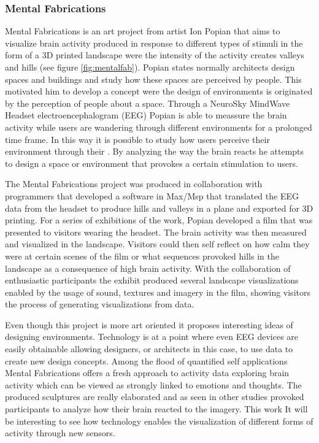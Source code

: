 \documentclass[../medieninformatik-arbeit.tex]{subfiles}
\begin{document}
\subsubsection{Mental Fabrications}
Mental Fabrications is an art project from artist Ion Popian\cite{mental2014fabrications} that aims to visualize brain activity produced in response to different types of stimuli in the form of a 3D printed landscape were the intensity of the activity creates valleys and hills (see figure \ref{fig:mentalfab}). Popian states normally architects design spaces and buildings and study how these spaces are perceived by people. This motivated him to develop a concept were the design of environments is originated by the perception of people about a space. Through a NeuroSky MindWave Headset\cite{nuero2015sky} electroencephalogram (EEG) Popian is able to meassure the brain activity while users are wandering through different environments for a prolonged time frame. In this way it is possible to study how users perceive their environment through their . By analyzing the way the brain reacts he attempts to design a space or environment that provokes a certain stimulation to users.  

The Mental Fabrications project was produced in collaboration with programmers that developed a software in Max/Msp\cite{cylcing2015maxsmp} that translated the EEG data from the headset to produce hills and valleys in a plane and exported for 3D printing.
For a series of exhibitions of the work, Popian developed a film that was presented to visitors wearing the headset. The brain activity was then measured and visualized in the landscape. Visitors could then self reflect on how calm they were at certain scenes of the film or what sequences provoked hills in the landscape as a consequence of high brain activity. With the collaboration of enthusiastic participants the exhibit produced several landscape visualizations enabled by the usage of sound, textures and imagery in the film, showing visitors the process of generating visualizations from data.

Even though this project is more art oriented it proposes interesting ideas of designing environments. Technology is at a point where even EEG devices are easily obtainable allowing designers, or architects in this case, to use data to create new design concepts. Among the flood of quantified self applications Mental Fabrications offers a fresh approach to activity data exploring brain activity which can be viewed as strongly linked to emotions and thoughts. The produced sculptures are really elaborated and as seen in other studies provoked participants to analyze how their brain reacted to the imagery. This work It will be interesting to see how technology enables the visualization of different forms of activity through new sensors. 
\end{document}
